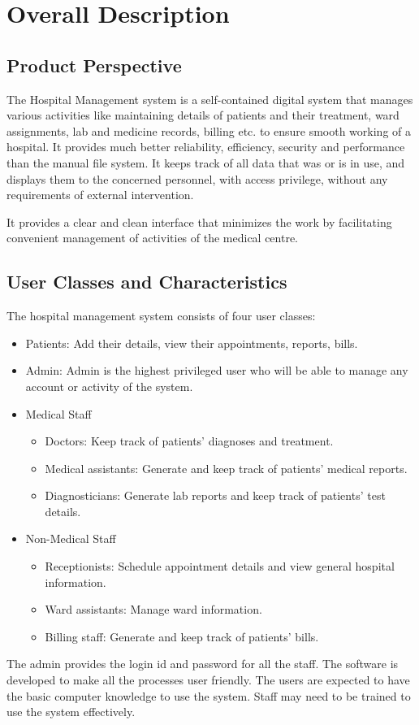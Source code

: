 \documentclass{scrreprt}
\begin{document}
\chapter{Overall Description}

\section{Product Perspective}
The Hospital Management system is a self-contained digital system that manages various activities like maintaining details of patients and their treatment, ward assignments, lab and medicine records, billing etc. to ensure smooth working of a hospital. It provides much better reliability, efficiency, security and performance than the manual file system.
It keeps track of all data that was or is in use, and displays them to the concerned personnel, with access privilege, without any requirements of external intervention.

It provides a clear and clean interface that minimizes the work by facilitating convenient management of activities of the medical centre.

\section{User Classes and Characteristics}
The hospital management system consists of four user classes:

\begin{itemize}
  \item Patients: Add their details, view their appointments, reports, bills.
  \item Admin: Admin is the highest privileged user who will be able to manage any account or activity of the system.
  \item Medical Staff
    \begin{itemize}
        \item Doctors: Keep track of patients' diagnoses and treatment. 
        \item Medical assistants: Generate and keep track of patients' medical reports.
        \item Diagnosticians: Generate lab reports and keep track of patients' test details.   
    \end{itemize}
    
    \item Non-Medical Staff
    \begin{itemize}
        \item Receptionists: Schedule appointment details and view general hospital information.
        \item Ward assistants: Manage ward information.
        \item Billing staff: Generate and keep track of patients' bills. 
    \end{itemize}

\end{itemize}
The admin provides the login id and password for all the staff. The software is developed to make all the processes user friendly. The users are expected to have the basic computer knowledge to use the system. Staff may need to be trained to use the system effectively.
\end{document}
